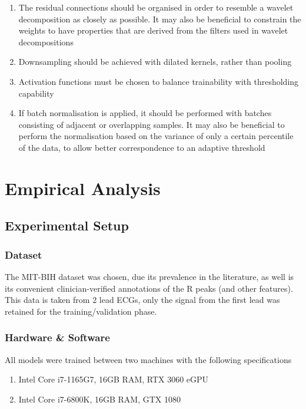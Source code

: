\documentclass[9pt,conference]{IEEEtran}
\begin{document}
\begin{enumerate}
    \item The residual connections should be organised in order to resemble a wavelet decomposition as closely as possible. It may also be beneficial to constrain the weights to have properties that are derived from the filters used in wavelet decompositions
    \item Downsampling should be achieved with dilated kernels, rather than pooling
    \item Activation functions must be chosen to balance trainability with thresholding capability
    \item If batch normalisation is applied, it should be performed with batches consisting of adjacent or overlapping samples. It may also be beneficial to perform the normalisation based on the variance of only a certain percentile of the data, to allow better correspondence to an adaptive threshold
\end{enumerate}

\section{Empirical Analysis}

\subsection{Experimental Setup}
\subsubsection{Dataset}
The MIT-BIH dataset\cite{dataset} was chosen, due its prevalence in the literature, as well is its convenient clinician-verified annotations of the R peaks (and other features). This data is taken from 2 lead ECGs, only the signal from the first lead was retained for the training/validation phase.

\subsubsection{Hardware \& Software}
All models were trained between two machines with the following specifications

\begin{enumerate}
    \item  Intel Core i7-1165G7, 16GB RAM, RTX 3060 eGPU
    \item  Intel Core i7-6800K, 16GB RAM, GTX 1080
\end{enumerate}
\end{document}
